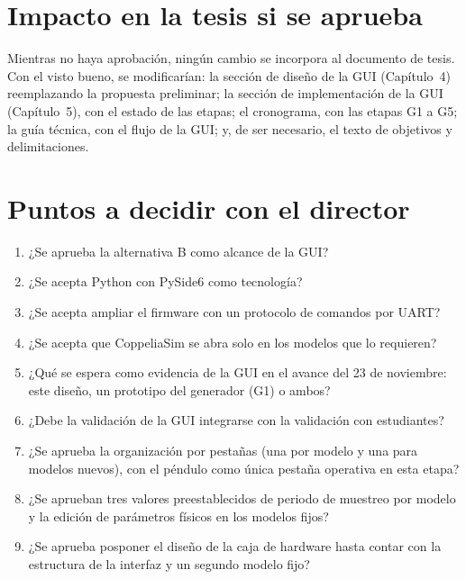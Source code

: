 \documentclass[12pt,letterpaper]{article}
\begin{document}
\section{Impacto en la tesis si se aprueba}
\label{sec:impacto}

Mientras no haya aprobación, ningún cambio se incorpora al documento de tesis. Con el visto bueno, se modificarían: la sección de diseño de la GUI (Capítulo~4) reemplazando la propuesta preliminar; la sección de implementación de la GUI (Capítulo~5), con el estado de las etapas; el cronograma, con las etapas G1 a G5; la guía técnica, con el flujo de la GUI; y, de ser necesario, el texto de objetivos y delimitaciones.

\section{Puntos a decidir con el director}
\label{sec:decisiones_director}

\begin{enumerate}
    \item ¿Se aprueba la alternativa B como alcance de la GUI?
    \item ¿Se acepta Python con PySide6 como tecnología?
    \item ¿Se acepta ampliar el firmware con un protocolo de comandos por UART?
    \item ¿Se acepta que CoppeliaSim se abra solo en los modelos que lo requieren?
    \item ¿Qué se espera como evidencia de la GUI en el avance del 23 de noviembre: este diseño, un prototipo del generador (G1) o ambos?
    \item ¿Debe la validación de la GUI integrarse con la validación con estudiantes?
    \item ¿Se aprueba la organización por pestañas (una por modelo y una para modelos nuevos), con el péndulo como única pestaña operativa en esta etapa?
    \item ¿Se aprueban tres valores preestablecidos de periodo de muestreo por modelo y la edición de parámetros físicos en los modelos fijos?
    \item ¿Se aprueba posponer el diseño de la caja de hardware hasta contar con la estructura de la interfaz y un segundo modelo fijo?
\end{enumerate}
\end{document}
